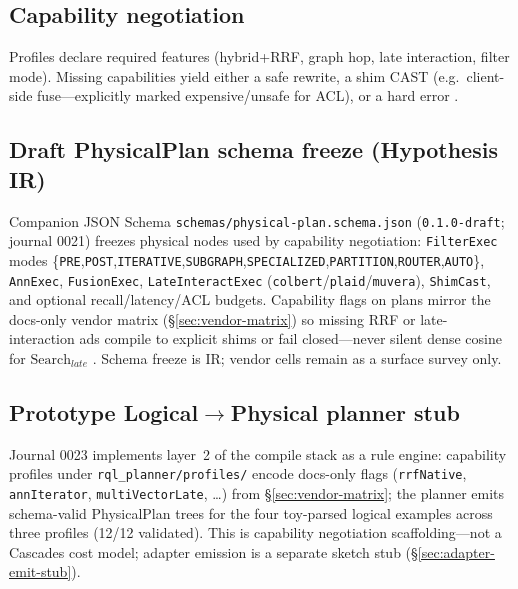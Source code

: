 \subsection{Capability negotiation}
Profiles declare required features (hybrid+RRF, graph hop, late interaction, filter mode).
Missing capabilities yield either a safe rewrite, a shim CAST (e.g.\ client-side fuse---explicitly marked expensive/unsafe for ACL), or a hard error \hypothesis{}.

\subsection{Draft PhysicalPlan schema freeze (Hypothesis IR)}
\label{sec:physical-schema}
Companion JSON Schema \texttt{schemas/physical-plan.schema.json} (\texttt{0.1.0-draft}; journal 0021) freezes physical nodes used by capability negotiation: \texttt{FilterExec} modes \{\texttt{PRE},\texttt{POST},\texttt{ITERATIVE},\texttt{SUBGRAPH},\texttt{SPECIALIZED},\texttt{PARTITION},\texttt{ROUTER},\texttt{AUTO}\}, \texttt{AnnExec}, \texttt{FusionExec}, \texttt{LateInteractExec} (\texttt{colbert}/\texttt{plaid}/\texttt{muvera}), \texttt{ShimCast}, and optional recall/latency/ACL budgets.
Capability flags on plans mirror the docs-only vendor matrix (\S\ref{sec:vendor-matrix}) so missing RRF or late-interaction ads compile to explicit shims or fail closed---never silent dense cosine for $\mathrm{Search}_{late}$ \hypothesis{}.
Schema freeze is \hypothesis{} IR; vendor cells remain \established{} as a surface survey only.

\subsection{Prototype Logical$\rightarrow$Physical planner stub}
\label{sec:planner-stub-compile}
Journal 0023 implements layer~2 of the compile stack as a \hypothesis{} rule engine: capability profiles under \texttt{rql\_planner/profiles/} encode docs-only flags (\texttt{rrfNative}, \texttt{annIterator}, \texttt{multiVectorLate}, \ldots) from \S\ref{sec:vendor-matrix}; the planner emits schema-valid PhysicalPlan trees for the four toy-parsed logical examples across three profiles (12/12 validated).
This is capability negotiation scaffolding---not a Cascades cost model; adapter emission is a separate sketch stub (\S\ref{sec:adapter-emit-stub}).

